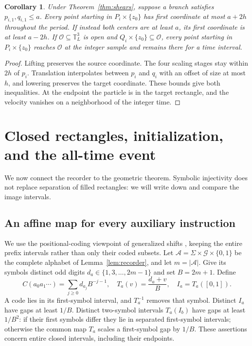 \documentclass[11pt]{article}
\newtheorem{corollary}[theorem]{Corollary}
\theoremstyle{remark}
\newcommand{\T}{\mathbb T}
\begin{document}
\begin{corollary}\label{cor:observer}
Under Theorem~\ref{thm:shears}, suppose a branch satisfies
$p_{i,1},q_{i,1}\le a$. Every point starting in $P_i\times\{z_0\}$
has first coordinate at most $a+2h$ throughout the period. If instead
both centers are at least $a$, its first coordinate is at least $a-2h$.
If $\mathcal O\subseteq\T_L^3$ is open and
$Q_i\times\{z_0\}\subseteq\mathcal O$, every point starting in
$P_i\times\{z_0\}$ reaches $\mathcal O$ at the integer sample and
remains there for a time interval.
\end{corollary}
\begin{proof}
Lifting preserves the source coordinate. The four scaling stages stay
within $2h$ of $p_i$. Translation interpolates between $p_i$ and $q_i$
with an offset of size at most $h$, and lowering preserves the target
coordinate. These bounds give both inequalities. At the endpoint the
particle is in the target rectangle, and the velocity vanishes on a
neighborhood of the integer time.
\end{proof}



\section{Closed rectangles, initialization, and the all-time event}\label{sec:bridge}
We now connect the recorder to the geometric theorem. Symbolic injectivity
does not replace separation of filled rectangles: we will write down and
compare the image intervals.

\subsection{An affine map for every auxiliary instruction}
We use the positional-coding viewpoint of generalized shifts
\cite[Lemma~0]{Moore}, keeping the entire prefix intervals rather than only
their coded subsets.
Let $\mathcal A=\Sigma\times\mathcal G\times\{0,1\}$ be the complete
alphabet of Lemma~\ref{lem:recorder}, and let $m=|\mathcal A|$.
Give its symbols distinct odd digits $d_a\in\{1,3,\ldots,2m-1\}$ and set
$B=2m+1$. Define
\[
 C(a_0a_1\cdots)=\sum_{j\ge0}d_{a_j}B^{-j-1},\quad
 T_a(v)=\frac{d_a+v}{B},\quad I_a=T_a([0,1]).
\]
A code lies in its first-symbol interval, and $T_a^{-1}$ removes that
symbol. Distinct $I_a$ have gaps at least $1/B$. Distinct two-symbol
intervals $T_a(I_b)$ have gaps at least $1/B^2$: if their first symbols
differ they lie in separated first-symbol intervals; otherwise the common
map $T_a$ scales a first-symbol gap by $1/B$. These assertions concern
entire closed intervals, including their endpoints.
\end{document}
